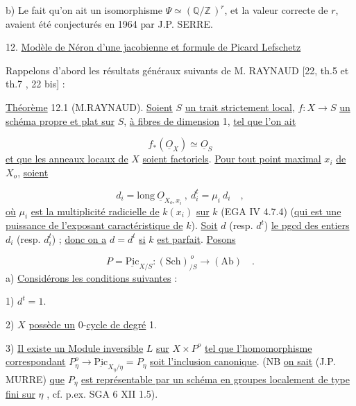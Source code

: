b) Le fait qu'on ait un isomorphisme $\Psi \simeq (\mathbb{Q}/\mathbb{Z}\,)^r$, et la valeur correcte de $r$, avaient été conjecturés en 1964 par J.P. SERRE.




12. \underline{Modèle de Néron d'une jacobienne et formule de Picard Lefschetz}

Rappelons d'abord les résultats généraux suivants de M. RAYNAUD [22, th.5 et th.7 , 22 bis] :

\underline{Théorème} 12.1 (M.RAYNAUD). \underline{Soient} $S$ \underline{un trait strictement local}, $f:X \to S$ \underline{un schéma propre et plat sur} $S$, \underline{à fibres de dimension} 1, \underline{tel que l'on ait}

\begin{equation}\tag{12.1.1}
f_*(\underline{O}_X) \simeq \underline{O}_S
\end{equation}
\underline{et que les anneaux locaux de} $X$ \underline{soient factoriels}. \underline{Pour tout point maximal} $x_i$ \underline{de} $X_o$, \underline{soient}

\begin{equation}\tag{12.1.2}
d_i = \mathrm{long}\ \underline{O}_{X_o,x_i} \ , \ d_i^t = \mu_i \ d_i \quad ,
\end{equation}
\underline{où} $\mu_i$ \underline{est la multiplicité radicielle de} $k(x_i)$ \underline{sur} $k$ (EGA IV 4.7.4) (\underline{qui est une puissance de l'exposant caractéristique de} $k$). \underline{Soit} $d$ (resp. $d^t$) \underline{le pgcd des entiers} $d_i$ (resp. $d_i^t$) ; \underline{donc on a} $d = d^t$ \underline{si} $k$ \underline{est parfait}. \underline{Posons}

\begin{equation}\tag{12.1.3}
P = \underline{\mathrm{Pic}}_{X/S} : (\mathrm{Sch})_{/S}^{\,o} \longrightarrow (\mathrm{Ab}) \quad .
\end{equation}
a) \underline{Considérons les conditions suivantes} :

1) $d^t=1$.

2) $X$ \underline{possède un} $0$-\underline{cycle de degré} 1.

3) \underline{Il existe un Module inversible} $L$ \underline{sur} $X \times P^o$ \underline{tel que l'homomorphisme correspondant} $P^o_\eta \longrightarrow \underline{\mathrm{Pic}}_{X_\eta/\eta} = P_\eta$ \underline{soit l'inclusion canonique}. (NB \underline{on sait} (J.P. MURRE) \underline{que} $P_\eta$ \underline{est représentable par un schéma en groupes localement de type fini sur} $\eta$ , cf. p.ex. SGA 6 XII 1.5).


